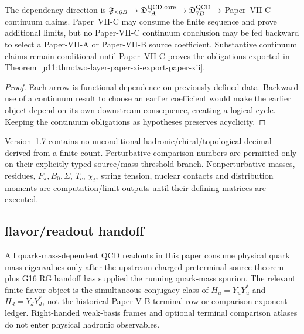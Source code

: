 \documentclass[12pt,a4paper]{article}
\begin{document}

\begin{corollary}
\label{p11:cor:paper-x-xii-circularity-audit}

The dependency direction is \(\mathfrak F_{\le6B}\to\mathfrak D_{7A}^{\rm QCD,core}\to\mathfrak D_{7B}^{\rm QCD}\to\) Paper~VII-C continuum claims.  Paper~VII-C may consume the finite sequence and prove additional limits, but no Paper-VII-C continuum conclusion may be fed backward to select a Paper-VII-A or Paper-VII-B source coefficient.  Substantive continuum claims remain conditional until Paper~VII-C proves the obligations exported in Theorem~\ref{p11:thm:two-layer-paper-xi-export-paper-xii}.

\end{corollary}
\begin{proof}

Each arrow is functional dependence on previously defined data.  Backward use of a continuum result to choose an earlier coefficient would make the earlier object depend on its own downstream consequence, creating a logical cycle.  Keeping the continuum obligations as hypotheses preserves acyclicity.
\end{proof}

\begin{remark}\label{p11:rem:printed-qcd-numerics-source-branch}
Version~1.7 contains no unconditional hadronic/chiral/topological decimal derived from a finite count.  Perturbative comparison numbers are permitted only on their explicitly typed source/mass-threshold branch.  Nonperturbative masses, residues, \(F_\pi,B_0,\Sigma\), \(T_c\), \(\chi_t\), string tension, nuclear contacts and distribution moments are computation/limit outputs until their defining matrices are executed.
\end{remark}


\subsection{flavor/readout handoff}
\label{pxi:sec:post-v125-flavor-handoff}

All quark-mass-dependent QCD readouts in this paper consume physical quark mass
eigenvalues only after the upstream charged preterminal source theorem plus G16 RG handoff has supplied the running quark-mass spurion.
The relevant finite flavor object is the simultaneous-conjugacy class of
$H_u=Y_uY_u^*$ and $H_d=Y_dY_d^*$, not the historical Paper-V-B terminal row or
comparison-exponent ledger.  Right-handed weak-basis frames and optional
terminal comparison atlases do not enter physical hadronic observables.
\end{document}
